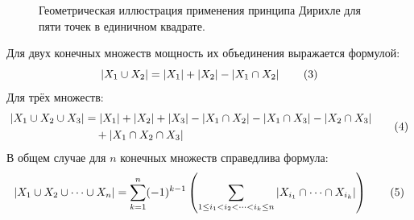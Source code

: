 \begin{example}
\begin{figure}[H]
        \caption{Геометрическая иллюстрация применения принципа Дирихле 
        для пяти точек в единичном квадрате.}
    \end{figure}
\end{example}

\begin{theorem}
    Для двух конечных множеств мощность их объединения выражается формулой:
    \begin{equation} \label{eq:pie_2}
        \left| X_1 \cup X_2 \right| = \left| X_1 \right| + \left| X_2 \right| - \left| X_1 \cap X_2 \right| \tag{3}
    \end{equation}
    Для трёх множеств:
    \begin{equation} \label{eq:pie_3}
        \begin{aligned}
            \left| X_1 \cup X_2 \cup X_3 \right| &= \left| X_1 \right| + \left| X_2 \right| + \left| X_3 \right| 
            - \left| X_1 \cap X_2 \right| - \left| X_1 \cap X_3 \right| - \left| X_2 \cap X_3 \right| \\
            &\quad + \left| X_1 \cap X_2 \cap X_3 \right|
        \end{aligned} \tag{4}
    \end{equation}
    В общем случае для $n$ конечных множеств справедлива формула:
    \begin{equation} \label{eq:pie_n}
        \left| X_1 \cup X_2 \cup \dots \cup X_n \right| = 
        \sum_{k=1}^{n} (-1)^{k-1} 
        \left( \sum_{1 \le i_1 < i_2 < \dots < i_k \le n} 
        \left| X_{i_1} \cap \dots \cap X_{i_k} \right| \right) \tag{5}
    \end{equation}
\end{theorem}

